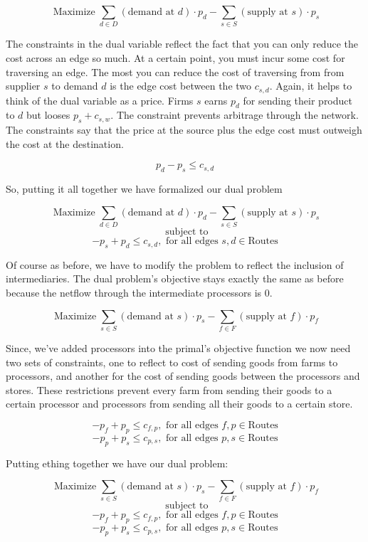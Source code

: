\documentclass{report}
\begin{document}
$$\operatorname{Maximize} \sum_{d \in D}  (\text{demand at } d) \cdot p_{d} -   \sum_{s \in S}  (\text{supply at } s) \cdot p_{s} $$

The constraints in the dual variable reflect the fact that you can only reduce the cost across an edge so much. At a certain point, you must incur some cost for traversing an edge. The most you can reduce the cost of traversing from from supplier $s$ to demand $d$ is the edge cost between the two $c_{s,d}$. Again, it helps to think of the dual variable as a price. Firms $s$ earns $p_d$ for sending their product to $d$ but looses $p_s + c_{s,w}$. The constraint prevents arbitrage through the network.  The constraints say that the price at the source plus the edge cost must outweigh the cost at the destination.

$$ p_d -p_s  \leq c_{s,d}$$

So, putting it all together we have formalized our dual problem

$$\operatorname{Maximize} \sum_{d \in D}  (\text{demand at } d) \cdot p_{d} -   \sum_{s \in S}  (\text{supply at } s) \cdot p_{s} $$
$$ \text{ subject to}$$
$$ -p_s + p_d \leq c_{s,d},  \text{ for all edges }  s,d\in \textrm{Routes}$$

Of course as before, we have to modify the problem to reflect the inclusion of intermediaries. The dual problem's objective stays exactly the same as before because the netflow through the intermediate processors is 0.

$$\operatorname{Maximize} \sum_{s \in S}  (\text{demand at } s) \cdot p_{s} -   \sum_{f \in F}  (\text{supply at } f) \cdot p_{f} $$

Since, we've added processors into the primal's objective function we now need two sets of constraints, one to reflect to cost of sending goods from farms to processors, and another for the cost of sending goods between the processors and stores. These restrictions  prevent every farm from sending their goods to a certain processor and processors from sending all their goods to a certain store.

$$ -p_f + p_p \leq c_{f,p}, \text{ for all edges }  f,p\in \textrm{Routes}$$
$$ -p_p + p_s \leq c_{p,s}, \text{ for all edges }  p,s\in \textrm{Routes}$$

Putting ething together we have our dual problem:

$$\operatorname{Maximize} \sum_{s \in S}  (\text{demand at } s) \cdot p_{s} -   \sum_{f \in F}  (\text{supply at } f) \cdot p_{f} $$
$$ \text{ subject to}$$
$$ -p_f + p_p \leq c_{f,p}, \text{ for all edges } f,p\in \textrm{Routes}$$
$$ -p_p + p_s \leq c_{p,s}, \text{ for all edges } p,s\in \textrm{Routes}$$
\end{document}
